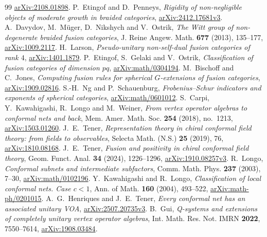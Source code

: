 \begin{thebibliography}{99}
\href{https://arxiv.org/abs/2108.01898}{arXiv:2108.01898}.
P.~Etingof and D.~Penneys, \emph{Rigidity of non-negligible objects of
moderate growth in braided categories},
\href{https://arxiv.org/abs/2412.17681v3}{arXiv:2412.17681v3}.
A.~Davydov, M.~M\"uger, D.~Nikshych and V.~Ostrik, \emph{The Witt group
of non-degenerate braided fusion categories}, J. Reine Angew. Math.
\textbf{677} (2013), 135--177,
\href{https://arxiv.org/abs/1009.2117}{arXiv:1009.2117}.
H.~Larson, \emph{Pseudo-unitary non-self-dual fusion categories of rank $4$},
\href{https://arxiv.org/abs/1401.1879}{arXiv:1401.1879}.
P.~Etingof, S.~Gelaki and V.~Ostrik, \emph{Classification of fusion
categories of dimension $pq$},
\href{https://arxiv.org/abs/math/0304194}{arXiv:math/0304194}.
M.~Bischoff and C.~Jones, \emph{Computing fusion rules for spherical
$G$-extensions of fusion categories},
\href{https://arxiv.org/abs/1909.02816}{arXiv:1909.02816}.
S.-H.~Ng and P.~Schauenburg, \emph{Frobenius--Schur indicators and
exponents of spherical categories},
\href{https://arxiv.org/abs/math/0601012}{arXiv:math/0601012}.
S.~Carpi, Y.~Kawahigashi, R.~Longo and M.~Weiner, \emph{From vertex
operator algebras to conformal nets and back}, Mem. Amer. Math. Soc.
\textbf{254} (2018), no.~1213,
\href{https://arxiv.org/abs/1503.01260}{arXiv:1503.01260}.
J.~E.~Tener, \emph{Representation theory in chiral conformal field theory:
from fields to observables}, Selecta Math. (N.S.) \textbf{25} (2019), 76,
\href{https://arxiv.org/abs/1810.08168v2}{arXiv:1810.08168}.
J.~E.~Tener, \emph{Fusion and positivity in chiral conformal field theory},
Geom. Funct. Anal. \textbf{34} (2024), 1226--1296,
\href{https://arxiv.org/abs/1910.08257v3}{arXiv:1910.08257v3}.
R.~Longo, \emph{Conformal subnets and intermediate subfactors},
Comm. Math. Phys. \textbf{237} (2003), 7--30,
\href{https://arxiv.org/abs/math/0102196}{arXiv:math/0102196}.
Y.~Kawahigashi and R.~Longo, \emph{Classification of local conformal nets.
Case $c<1$}, Ann. of Math. \textbf{160} (2004), 493--522,
\href{https://arxiv.org/abs/math-ph/0201015}{arXiv:math-ph/0201015}.
A.~G.~Henriques and J.~E.~Tener, \emph{Every conformal net has an associated
unitary VOA}, \href{https://arxiv.org/abs/2507.20735v3}{arXiv:2507.20735v3}.
B.~Gui, \emph{Q-systems and extensions of completely unitary vertex operator
algebras}, Int. Math. Res. Not. IMRN \textbf{2022}, 7550--7614,
\href{https://arxiv.org/abs/1908.03484v3}{arXiv:1908.03484}.

\end{thebibliography}
